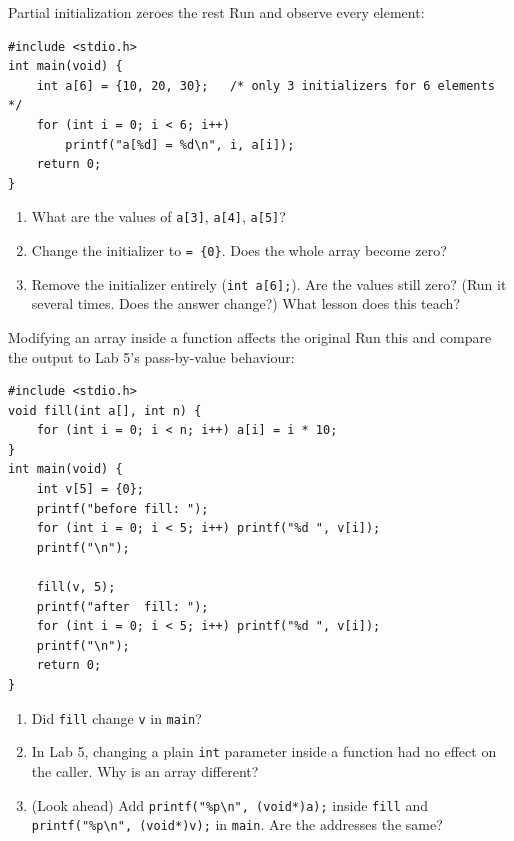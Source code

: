\documentclass[11pt]{article}
\begin{document}
\begin{tryit}{Partial initialization zeroes the rest}
Run and observe every element:
\begin{lstlisting}
#include <stdio.h>
int main(void) {
    int a[6] = {10, 20, 30};   /* only 3 initializers for 6 elements */
    for (int i = 0; i < 6; i++)
        printf("a[%d] = %d\n", i, a[i]);
    return 0;
}
\end{lstlisting}
\begin{enumerate}[nosep,leftmargin=*]
  \item What are the values of \texttt{a[3]}, \texttt{a[4]}, \texttt{a[5]}?
  \item Change the initializer to \texttt{= \{0\}}. Does the whole array become zero?
  \item Remove the initializer entirely (\texttt{int a[6];}). Are the values still zero?
        (Run it several times. Does the answer change?) What lesson does this teach?
\end{enumerate}
\end{tryit}

\begin{tryit}{Modifying an array inside a function affects the original}
Run this and compare the output to Lab 5's pass-by-value behaviour:
\begin{lstlisting}
#include <stdio.h>
void fill(int a[], int n) {
    for (int i = 0; i < n; i++) a[i] = i * 10;
}
int main(void) {
    int v[5] = {0};
    printf("before fill: ");
    for (int i = 0; i < 5; i++) printf("%d ", v[i]);
    printf("\n");

    fill(v, 5);
    printf("after  fill: ");
    for (int i = 0; i < 5; i++) printf("%d ", v[i]);
    printf("\n");
    return 0;
}
\end{lstlisting}
\begin{enumerate}[nosep,leftmargin=*]
  \item Did \texttt{fill} change \texttt{v} in \texttt{main}?
  \item In Lab 5, changing a plain \texttt{int} parameter inside a function had no effect
        on the caller. Why is an array different?
  \item (Look ahead) Add \texttt{printf("\%p{\textbackslash}n", (void*)a);} inside \texttt{fill} and
        \texttt{printf("\%p{\textbackslash}n", (void*)v);} in \texttt{main}. Are the addresses the same?
\end{enumerate}
\end{tryit}
\end{document}
